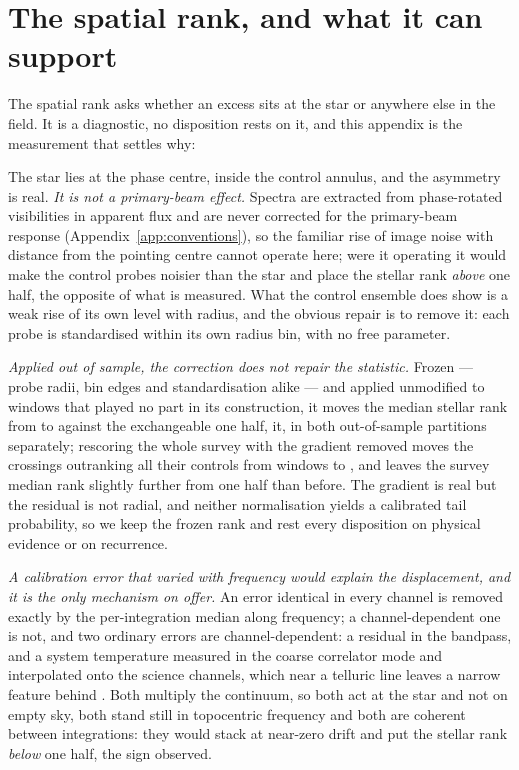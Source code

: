 \section{The spatial rank, and what it can support}
\label{app:radius}

The spatial rank asks whether an excess sits at the star or anywhere else in
the field. It is a diagnostic, no disposition rests on it, and this appendix
is the measurement that settles why: \rankstatus{}

The star lies at the phase centre, inside the control annulus, and the
asymmetry is real. \emph{It is not a primary-beam effect.} Spectra are
extracted from phase-rotated visibilities in apparent flux and are never
corrected for the primary-beam response (Appendix~\ref{app:conventions}), so
the familiar rise of image noise with distance from the pointing centre
cannot operate here; were it operating it would make the control probes
noisier than the star and place the stellar rank \emph{above} one half, the
opposite of what is measured. What the control ensemble does show is a weak
rise of its own level with radius, and the obvious repair is to remove it:
each probe is standardised within its own radius bin, with no free parameter.

\emph{Applied out of sample, the correction does not repair the statistic.}
Frozen --- probe radii, bin edges and standardisation alike --- and applied
unmodified to \RadValStarN{} windows that played no part in its construction,
it moves the median stellar rank from \RadValStarRawMed{} to
\RadValStarCorMed{} against the exchangeable one half, \RadValStarToward{}
it, in both out-of-sample partitions separately; rescoring the whole survey
with the gradient removed moves the crossings outranking all their controls
from \LocStageGlobal{} windows to \LocStageLocal, and leaves the survey
median rank slightly further from one half than before. The gradient is real
but the residual is not radial, and neither normalisation yields a calibrated
tail probability, so we keep the frozen rank and rest every disposition on
physical evidence or on recurrence.

\emph{A calibration error that varied with frequency would explain the
displacement, and it is the only mechanism on offer.} An error identical in
every channel is removed exactly by the per-integration median along
frequency; a channel-dependent one is not, and two ordinary errors are
channel-dependent: a residual in the bandpass, and a system temperature
measured in the coarse correlator mode and interpolated onto the science
channels, which near a telluric line leaves a narrow feature behind
\citep{ALMATsys2018}. Both
multiply the continuum, so both act at the star and not on empty sky, both
stand still in topocentric frequency and both are coherent between
integrations: they would stack at near-zero drift and put the stellar rank
\emph{below} one half, the sign observed.

